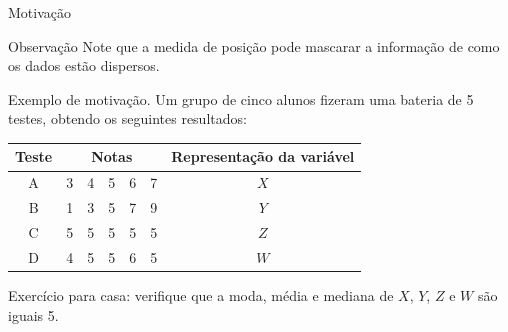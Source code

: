 \documentclass[8pt]{beamer}
\begin{document}
\begin{frame}{Motivação}
 \begin{block}{Observação}
  Note que a medida de posição pode mascarar a informação de como os dados estão dispersos.
 \end{block}
 
 \begin{block}{Exemplo de motivação.}
  Um grupo de cinco alunos fizeram uma bateria de 5 testes, obtendo os seguintes resultados:
  \begin{table}
   \centering
   \begin{tabular}{c|ccccc|c}
   \toprule[0.05cm]
    Teste & \multicolumn{5}{|c|}{Notas} & Representação da variável \\ \midrule[0.05cm]
    A & 3 & 4 & 5 & 6 & 7 & $X$ \\
    B & 1 & 3 & 5 & 7 & 9 & $Y$ \\
    C & 5 & 5 & 5 & 5 & 5 & $Z$ \\
    D & 4 & 5 & 5 & 6 & 5 & $W$\\ \bottomrule[0.05cm]
   \end{tabular}
  \end{table}
  {\color{magenta} Exercício para casa:} verifique que a moda, média e mediana de $X$, $Y$, $Z$ e $W$ são iguais 5.
 \end{block}
\end{frame}
\end{document}
